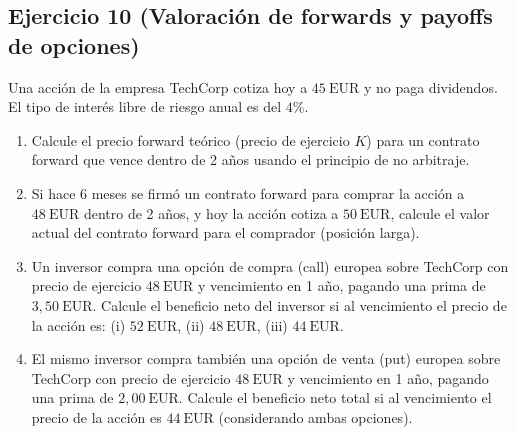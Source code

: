 \documentclass[12pt,a4paper]{article}
\newcommand{\EUR}[1]{\ensuremath{#1~\text{EUR}}}
\newenvironment{ejercicio}[1]{\subsection*{Ejercicio #1}}{}
\begin{document}
\begin{ejercicio}{10 (Valoración de forwards y payoffs de opciones)}
Una acción de la empresa TechCorp cotiza hoy a \EUR{45} y no paga dividendos. El tipo de interés libre de riesgo anual es del \(4\%\).
\begin{enumerate}[label=\alph*)]
  \item Calcule el precio forward teórico (precio de ejercicio \(K\)) para un contrato forward que vence dentro de 2 años usando el principio de no arbitraje.
  \item Si hace 6 meses se firmó un contrato forward para comprar la acción a \EUR{48} dentro de 2 años, y hoy la acción cotiza a \EUR{50}, calcule el valor actual del contrato forward para el comprador (posición larga).
  \item Un inversor compra una opción de compra (call) europea sobre TechCorp con precio de ejercicio \EUR{48} y vencimiento en 1 año, pagando una prima de \EUR{3{,}50}. Calcule el beneficio neto del inversor si al vencimiento el precio de la acción es: (i) \EUR{52}, (ii) \EUR{48}, (iii) \EUR{44}.
  \item El mismo inversor compra también una opción de venta (put) europea sobre TechCorp con precio de ejercicio \EUR{48} y vencimiento en 1 año, pagando una prima de \EUR{2{,}00}. Calcule el beneficio neto total si al vencimiento el precio de la acción es \EUR{44} (considerando ambas opciones).
\end{enumerate}
\end{ejercicio}
\end{document}
